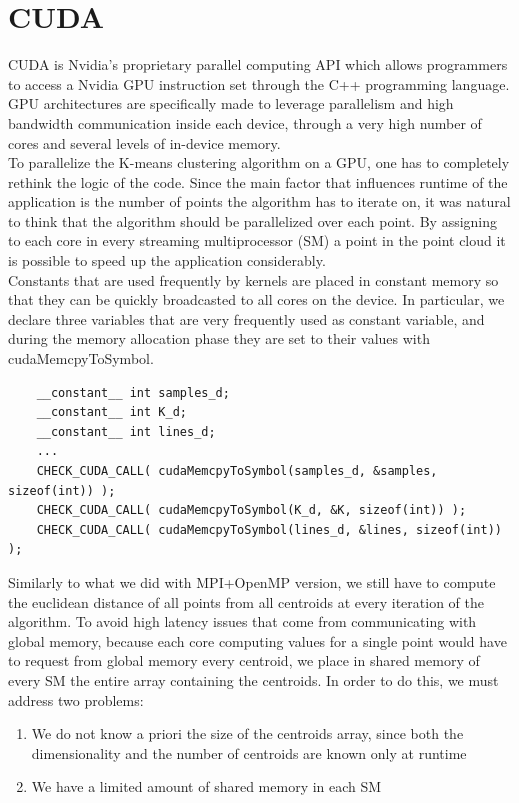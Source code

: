 \documentclass{article}
\begin{document}
\section*{CUDA}
CUDA is Nvidia's proprietary parallel computing API which allows programmers to access a Nvidia GPU instruction set through the C++ programming language. GPU architectures are specifically made to leverage parallelism and high bandwidth communication inside each device, through a very high number of cores and several levels of in-device memory.\\
To parallelize the K-means clustering algorithm on a GPU, one has to completely rethink the logic of the code. Since the main factor that influences runtime of the application is the number of points the algorithm has to iterate on, it was natural to think that the algorithm should be parallelized over each point. By assigning to each core in every streaming multiprocessor (SM) a point in the point cloud it is possible to speed up the application considerably.\\ 
Constants that are used frequently by kernels are placed in constant memory so that they can be quickly broadcasted to all cores on the device. In particular, we declare three variables that are very frequently used as constant variable, and during the memory allocation phase they are set to their values with cudaMemcpyToSymbol.
\begin{lstlisting}
    __constant__ int samples_d;
    __constant__ int K_d;
    __constant__ int lines_d;
    ...
    CHECK_CUDA_CALL( cudaMemcpyToSymbol(samples_d, &samples, sizeof(int)) );
    CHECK_CUDA_CALL( cudaMemcpyToSymbol(K_d, &K, sizeof(int)) );
    CHECK_CUDA_CALL( cudaMemcpyToSymbol(lines_d, &lines, sizeof(int)) );
\end{lstlisting}
Similarly to what we did with MPI+OpenMP version, we still have to compute the euclidean distance of all points from all centroids at every iteration of the algorithm. To avoid high latency issues that come from communicating with global memory, because each core computing values for a single point would have to request from global memory every centroid, we place in shared memory of every SM the entire array containing the centroids. In order to do this, we must address two problems:
\begin{enumerate}
    \item We do not know a priori the size of the centroids array, since both the dimensionality and the number of centroids are known only at runtime
    \item We have a limited amount of shared memory in each SM
\end{enumerate}
\end{document}
